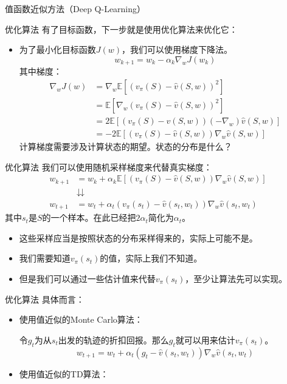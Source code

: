 \begin{section}{值函数近似方法\alert{（Deep Q-Learning）}}
\begin{frame}{优化算法}
    有了目标函数，下一步就是使用优化算法来优化它：
    \begin{itemize}
        \item 为了最小化目标函数$J(w)$，我们可以使用\alert{梯度下降法}。
        \[
            w_{k+1}=w_k-\alpha_k\nabla_w J(w_k)
        \]
        其中梯度：
        \[
            \begin{aligned}
                \nabla_w J(w)&=\nabla_w\mathbb{E}[(v_\pi(S)-\hat{v}(S,w))^2] \\
                &=\mathbb{E}[\nabla_w(v_\pi(S)-\hat{v}(S,w))^2]\\
                &=2\mathbb{E}[(v_\pi(S)-\hat{v}(S,w))(-\nabla_w)\hat{v}(S,w)]\\
                &=-2\mathbb{E}[(v_\pi(S)-\hat{v}(S,w))\nabla_w\hat{v}(S,w)]
            \end{aligned}
        \]
        计算梯度需要涉及计算状态的期望。状态的分布是什么？
    \end{itemize}
\end{frame}

\begin{frame}{优化算法}
    我们可以使用随机采样梯度来代替真实梯度：
    \[
        \begin{aligned}
            w_{k+1}&=w_k+\alpha_k\mathbb{E}[(v_\pi(S)-\hat{v}(S,w))\nabla_w\hat{v}(S,w)] \\
            &\downdownarrows \\
            w_{t+1}&=w_t+\alpha_t(v_\pi(s_t)-\hat{v}(s_t,w_t))\nabla_w\hat{v}(s_t,w_t)
        \end{aligned}
    \]
    其中$s_t$是$S$的一个样本。在此已经把$2\alpha_t$简化为$\alpha_t$。
    \begin{itemize}
        \item 这些采样应当是按照状态的分布采样得来的，实际上可能不是。
        \item 我们需要知道$v_\pi(s_t)$的值，实际上我们不知道。
        \item 但是我们可以通过一些估计值来代替$v_\pi(s_t)$，至少让算法先可以实现。
    \end{itemize}
\end{frame}

\begin{frame}{优化算法}
    具体而言：
    \begin{itemize}
        \item 使用值近似的Monte Carlo算法：
        
        令$g_t$为从$s_t$出发的轨迹的折扣回报。那么$g_t$就可以用来估计$v_\pi(s_t)$。
        \[
            w_{t+1}=w_t+\alpha_t(g_t-\hat{v}(s_t,w_t))\nabla_w\hat{v}(s_t,w_t)
        \]
        \item 使用值近似的TD算法：
        

\end{itemize}
\end{frame}
\end{section}
